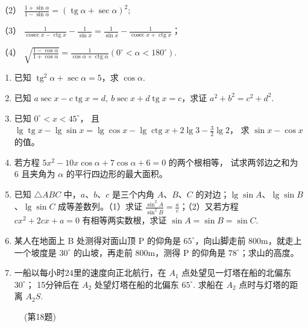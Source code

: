（2）
\(\frac{1 + \sin\alpha}{1 - \sin\alpha} = (\operatorname{tg}\alpha + \sec\alpha)^2;\)

（3）
\(\frac{1}{\operatorname{cosec} x - \operatorname{ctg} x} - \frac{1}{\sin x} = \frac{1}{\sin x} - \frac{1}{\operatorname{cosec} x + \operatorname{ctg} x}\)；

（4）
\(\sqrt{\frac{1 - \cos\alpha}{1 + \cos\alpha}} = \frac{1}{\cos\alpha + \operatorname{ctg}\alpha} (0^{\circ} < \alpha < 180^{\circ})\).

\begin{enumerate}[start=12]
\item
  已知 \(\operatorname{tg}^2\alpha + \sec \alpha = 5\)，求
  \(\cos \alpha\).
\item
  已知
  \(a\sec x-c\operatorname{tg}x=d,\ b\sec x+d\operatorname{tg}x=c\)，求证
  \(a^2 + b^2 = c^2 + d^2\).
\item
  已知 \(0^{\circ} < x < 45^{\circ}\)， 且
  \(\lg \operatorname{tg} x - \lg \sin x = \lg \cos x - \lg \operatorname{ctg} x + 2 \lg 3 - \frac{3}{2} \lg 2\)，
  求 \(\sin x - \cos x\) 的值。
\item
  若方程 \(5x^{2} - 10x\cos \alpha + 7\cos \alpha + 6 = 0\)
  的两个根相等， 试求两邻边之和为 6 且夹角为 \(\alpha\)
  的平行四边形的最大面积。
\item
  已知 \(\triangle ABC\) 中，\(a\)、\(b\)、\(c\) 是三个内角 \(A\)、\(B\)、\(C\)
  的对边；\(\lg \sin A\)、\(\lg \sin B\)、\(\lg \sin C\) 成等差数列。（1）求证
  \(\frac{\sin^2 A}{\sin^2 B} = \frac{a}{c}\)；（2）又若方程
  \(cx^2 + 2cx + a = 0\) 有相等两实数根，求证
  \(\sin A = \sin B = \sin C\).
\item
  某人在地面上 B 处测得对面山顶 P 的仰角是 \(65^{\circ}\)，向山脚走前
  800m，就走上一个坡度是 \(30^{\circ}\) 的山坡，再走前 800m，测得 P
  的仰角是 \(78^{\circ}\)；求山的高度。
\item
  一船以每小时24里的速度向正北航行，在 \(A_{1}\)
  点处望见一灯塔在船的北偏东 \(30^{\circ}\)； 15分钟后在 \(A_{2}\)
  处望灯塔在船的北偏东 \(65^{\circ}\). 求船在 \(A_{2}\) 点时与灯塔的距离
  \(A_{2}S\).
\end{enumerate}

\begin{figure}
\centering
{}
\caption{(第18题)}
\end{figure}


